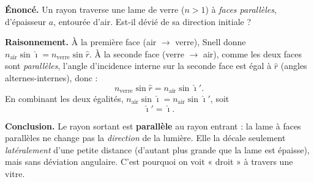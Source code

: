 \documentclass[11pt,a4paper]{article}
\newcommand{\angi}{\hat{\imath}}     %
\begin{document}
\begin{exemple}
\textbf{Énoncé.} Un rayon traverse une lame de verre ($n > 1$) à \emph{faces parallèles}, d'épaisseur
$a$, entourée d'air. Est-il dévié de sa direction initiale ?

\smallskip
\begin{center}
\end{center}

\textbf{Raisonnement.} À la première face (air $\to$ verre), Snell donne
$n_{\text{air}}\sin\angi = n_{\text{verre}}\sin\hat r$. À la seconde face (verre $\to$ air), comme
les deux faces sont \emph{parallèles}, l'angle d'incidence interne sur la seconde face est égal à
$\hat r$ (angles alternes-internes), donc :
\[ n_{\text{verre}}\sin\hat r = n_{\text{air}}\sin\angi'. \]
En combinant les deux égalités, $n_{\text{air}}\sin\angi = n_{\text{air}}\sin\angi'$, soit
\[ \boxed{\angi' = \angi}. \]

\textbf{Conclusion.} Le rayon sortant est \textbf{parallèle} au rayon entrant : la lame à faces
parallèles ne change pas la \emph{direction} de la lumière. Elle la décale seulement
\emph{latéralement} d'une petite distance (d'autant plus grande que la lame est épaisse), mais
sans déviation angulaire. C'est pourquoi on voit « droit » à travers une vitre.
\end{exemple}
\end{document}
